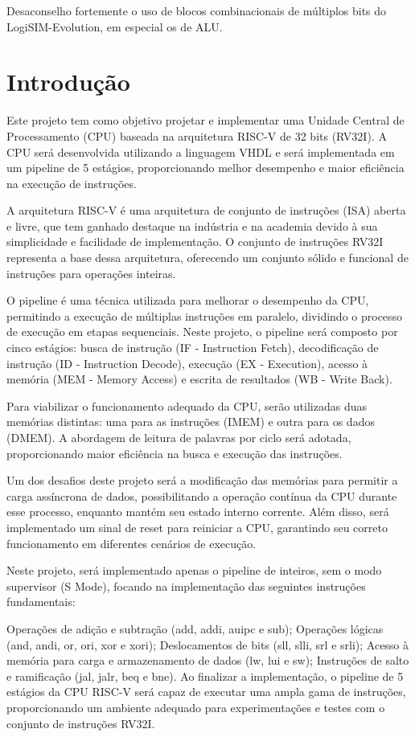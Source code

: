 \documentclass[12pt]{article}
\begin{document}
Desaconselho fortemente o uso de blocos combinacionais de múltiplos bits do LogiSIM-Evolution, em especial os de ALU.

\section{Introdução}
Este projeto tem como objetivo projetar e implementar uma Unidade Central de Processamento (CPU) baseada na arquitetura RISC-V de 32 bits (RV32I). A CPU será desenvolvida utilizando a linguagem VHDL e será implementada em um pipeline de 5 estágios, proporcionando melhor desempenho e maior eficiência na execução de instruções.

A arquitetura RISC-V é uma arquitetura de conjunto de instruções (ISA) aberta e livre, que tem ganhado destaque na indústria e na academia devido à sua simplicidade e facilidade de implementação. O conjunto de instruções RV32I representa a base dessa arquitetura, oferecendo um conjunto sólido e funcional de instruções para operações inteiras.

O pipeline é uma técnica utilizada para melhorar o desempenho da CPU, permitindo a execução de múltiplas instruções em paralelo, dividindo o processo de execução em etapas sequenciais. Neste projeto, o pipeline será composto por cinco estágios: busca de instrução (IF - Instruction Fetch), decodificação de instrução (ID - Instruction Decode), execução (EX - Execution), acesso à memória (MEM - Memory Access) e escrita de resultados (WB - Write Back).

Para viabilizar o funcionamento adequado da CPU, serão utilizadas duas memórias distintas: uma para as instruções (IMEM) e outra para os dados (DMEM). A abordagem de leitura de palavras por ciclo será adotada, proporcionando maior eficiência na busca e execução das instruções.

Um dos desafios deste projeto será a modificação das memórias para permitir a carga assíncrona de dados, possibilitando a operação contínua da CPU durante esse processo, enquanto mantém seu estado interno corrente. Além disso, será implementado um sinal de reset para reiniciar a CPU, garantindo seu correto funcionamento em diferentes cenários de execução.

Neste projeto, será implementado apenas o pipeline de inteiros, sem o modo supervisor (S Mode), focando na implementação das seguintes instruções fundamentais:

Operações de adição e subtração (add, addi, auipc e sub);
Operações lógicas (and, andi, or, ori, xor e xori);
Deslocamentos de bits (sll, slli, srl e srli);
Acesso à memória para carga e armazenamento de dados (lw, lui e sw);
Instruções de salto e ramificação (jal, jalr, beq e bne).
Ao finalizar a implementação, o pipeline de 5 estágios da CPU RISC-V será capaz de executar uma ampla gama de instruções, proporcionando um ambiente adequado para experimentações e testes com o conjunto de instruções RV32I.
\end{document}
